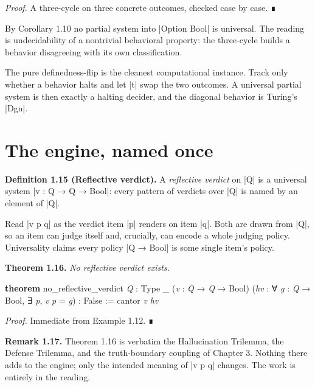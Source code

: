 \documentclass{memoir}
\begin{document}
\emph{Proof.} A three-cycle on three concrete outcomes, checked case by case. ∎

By Corollary 1.10 no partial system into \LeanVerb|Option Bool| is universal. The reading
is undecidability of a nontrivial behavioral property: the three-cycle builds a
behavior disagreeing with its own classification.

The pure definedness-flip is the cleanest computational instance. Track only
whether a behavior halts and let \LeanVerb|t| swap the two outcomes. A universal partial
system is then exactly a halting decider, and the diagonal behavior is Turing's
\LeanVerb|Dgn|.



\section{The engine, named once}\label{Two--Schemas--of--Impossibility-005F-005F-005F--Machine--Checked--Limits--of--Trustworthy--Machine--Learning-005F-005F-005F--and--Why--They--Tighten--with--Capability----The--Diagonal----The--engine-005F-005F-005F--named--once}

\textbf{Definition 1.15 (Reflective verdict).} A \emph{reflective verdict} on \LeanVerb|Q| is a
universal system \LeanVerb|v : Q → Q → Bool|: every pattern of verdicts over \LeanVerb|Q| is named
by an element of \LeanVerb|Q|.

Read \LeanVerb|v p q| as the verdict item \LeanVerb|p| renders on item \LeanVerb|q|. Both are drawn from
\LeanVerb|Q|, so an item can judge itself and, crucially, can encode a whole judging
policy. Universality claims every policy \LeanVerb|Q → Bool| is some single item's
policy.

\textbf{Theorem 1.16.} \emph{No reflective verdict exists.}

\begin{LeanVerbatim}
\textbf{theorem} no_reflective_verdict \textit{Q} : Type _
    (\textit{v} : \textit{Q} → \textit{Q} → Bool)
    (\textit{hv} : ∀ \textit{g} : \textit{Q} → Bool, ∃ \textit{p}, \textit{v} \textit{p} = \textit{g}) : False :=
  cantor \textit{v} \textit{hv}

\end{LeanVerbatim}


\emph{Proof.} Immediate from Example 1.12. ∎

\textbf{Remark 1.17.} Theorem 1.16 is verbatim the Hallucination Trilemma, the Defense
Trilemma, and the truth-boundary coupling of Chapter 3. Nothing there adds to
the engine; only the intended meaning of \LeanVerb|v p q| changes. The work is entirely
in the reading.
\end{document}
